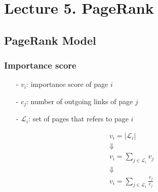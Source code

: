 \section{Lecture 5. PageRank}
\begin{multicols}{2}
\subsection{PageRank Model}
\subsubsection{Importance score}
\begin{itemize}
    \item [-] $v_i$: importance score of page $i$
    \item [-] $c_j$: number of outgoing links of page $j$
    \item [-] $\mathcal{L}_i$: set of pages that refers to page $i$
\end{itemize}
\[
    \begin{array}{c}
        v_i = |\mathcal{L}_i| \\
        \Downarrow \\
        v_i = \sum_{j\in \mathcal{L}_i} v_j \\
        \Downarrow \\
        v_i = \sum_{j\in \mathcal{L}_i} \frac{v_j}{c_j}
    \end{array}
\]

\end{multicols}
